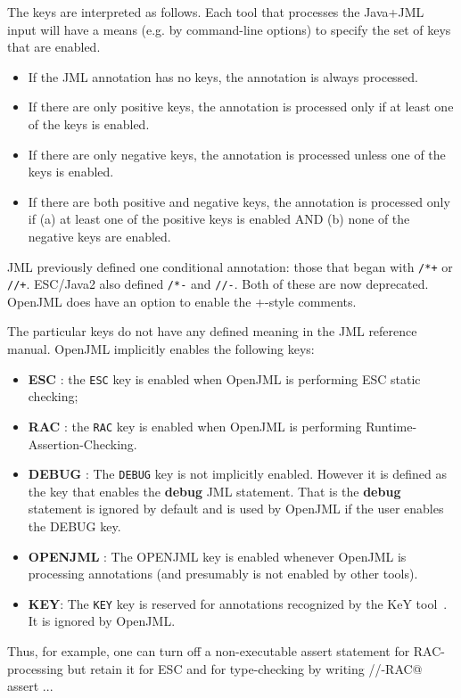 The keys are interpreted as follows. Each tool that processes the Java+JML input will have a means
(e.g. by command-line options) to specify the set of keys that are enabled.
\begin{itemize}
\item If the JML annotation has no keys, the annotation is always processed.
\item If there are only positive keys, the annotation is processed only if at least one of the keys is enabled.
\item If there are only negative keys, the annotation is processed unless one of the keys is enabled.
\item If there are both positive and negative keys, the annotation is processed only if (a) at least one of the
positive keys is enabled AND (b) none of the negative keys are enabled.
\end{itemize}

JML previously defined one conditional annotation: those that began with {\tt /*+\at} or {\tt //+\at}. ESC/Java2 also defined
{\tt /*-\at} and {\tt //-\at}. Both of these are now deprecated. OpenJML does have an option to enable the +-style comments.

The particular keys do not have any defined meaning in the JML reference manual. OpenJML implicitly enables the following keys:
\begin{itemize} 
\item {\bf ESC} : the \texttt{ESC} key is enabled when OpenJML is performing
ESC static checking; 
\item {\bf RAC} : the \texttt{RAC} key is enabled when OpenJML is performing Runtime-Assertion-Checking.
\item {\bf DEBUG} : The \texttt{DEBUG} key is not implicitly enabled. However it is defined as the key that enables the {\bf debug} JML statement. That is the {\bf debug} statement is ignored by default and is used by OpenJML if the user enables the DEBUG key.
\item {\bf OPENJML} : The OPENJML key is enabled whenever OpenJML is processing annotations (and presumably is not enabled by other tools).
\item {\bf KEY}: The \texttt{KEY} key is reserved for annotations recognized by the KeY tool~\cite{TBD}.  It is ignored by OpenJML.
\end{itemize}
Thus, for
example, one can turn off a non-executable assert statement for RAC-processing but retain it for ESC and for type-checking by writing //-RAC@ assert ... 


